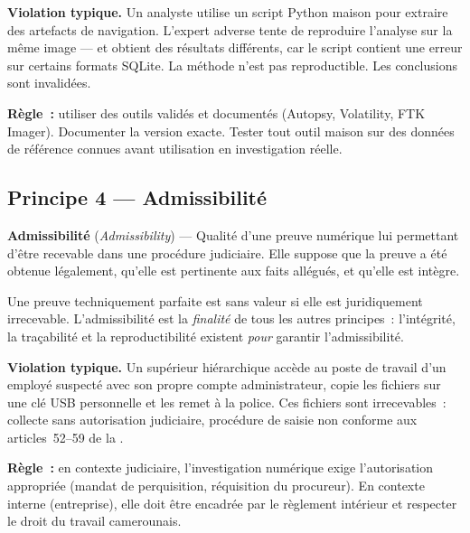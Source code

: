 \begin{boxalert}
\textbf{Violation typique.} Un analyste utilise un script Python maison
pour extraire des artefacts de navigation. L'expert adverse tente de
reproduire l'analyse sur la même image --- et obtient des résultats
différents, car le script contient une erreur sur certains formats SQLite.
La méthode n'est pas reproductible. Les conclusions sont invalidées.

\textbf{Règle~:} utiliser des outils validés et documentés (Autopsy,
Volatility, FTK Imager). Documenter la version exacte. Tester tout outil
maison sur des données de référence connues avant utilisation en investigation
réelle.
\end{boxalert}

\subsection{Principe 4 --- Admissibilité}
\label{subsec:principe-admissibilite}

\begin{boxdef}
\textbf{Admissibilité} (\textit{Admissibility}) ---
Qualité d'une preuve numérique lui permettant d'être recevable dans une
procédure judiciaire. Elle suppose que la preuve a été obtenue légalement,
qu'elle est pertinente aux faits allégués, et qu'elle est intègre.
\end{boxdef}

Une preuve techniquement parfaite est sans valeur si elle est juridiquement
irrecevable. L'admissibilité est la \emph{finalité} de tous les autres
principes~: l'intégrité, la traçabilité et la reproductibilité existent
\emph{pour} garantir l'admissibilité.

\begin{boxalert}
\textbf{Violation typique.} Un supérieur hiérarchique accède au poste de
travail d'un employé suspecté avec son propre compte administrateur, copie
les fichiers sur une clé USB personnelle et les remet à la police. Ces
fichiers sont irrecevables~: collecte sans autorisation judiciaire,
procédure de saisie non conforme aux articles~52--59 de la
.

\textbf{Règle~:} en contexte judiciaire, l'investigation numérique exige
l'autorisation appropriée (mandat de perquisition, réquisition du procureur).
En contexte interne (entreprise), elle doit être encadrée par le règlement
intérieur et respecter le droit du travail camerounais.
\end{boxalert}

